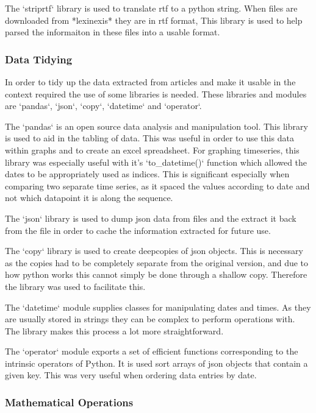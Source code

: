 The `striprtf` library is used to translate rtf to a python string. When files are downloaded from *lexinexis* they are in rtf format, This library is used to help parsed the informaiton in these files into a usable format.

\subsubsection{Data Tidying}

In order to tidy up the data extracted from articles and make it usable in the context required the use of some libraries is needed. These libraries and modules are `pandas`, `json`, `copy`, `datetime` and `operator`.

The `pandas` is an open source data analysis and manipulation tool. This library is used to aid in the tabling of data. This was useful in order to use this data within graphs and to create an excel spreadsheet. For graphing timeseries, this library was especially useful with it's `to_datetime()` function which allowed the dates to be appropriately used as indices. This is significant especially when comparing two separate time series, as it spaced the values according to date and not which datapoint it is along the sequence.

The `json` library is used to dump json data from files and the extract it back from the file in order to cache the information extracted for future use.

The `copy` library is used to create deepcopies of json objects. This is necessary as the copies had to be completely separate from the original version, and due to how python works this cannot simply be done through a shallow copy. Therefore the library was used to facilitate this.

The `datetime` module supplies classes for manipulating dates and times. As they are usually stored in strings they can be complex to perform operations with. The library makes this process a lot more straightforward.

The `operator` module exports a set of efficient functions corresponding to the intrinsic operators of Python. It is used sort arrays of json objects that contain a given key. This was very useful when ordering data entries by date.

\subsubsection{Mathematical Operations}

